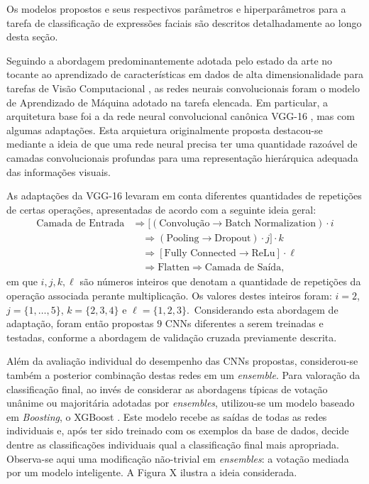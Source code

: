 Os modelos propostos e seus respectivos parâmetros e hiperparâmetros para a tarefa de classificação de expressões faciais são descritos detalhadamente ao longo desta seção.

Seguindo a abordagem predominantemente adotada pelo estado da arte no tocante ao aprendizado de características em dados de alta dimensionalidade para tarefas de Visão Computacional \cite{Khan:Livro}, as redes neurais convolucionais foram o modelo de Aprendizado de Máquina adotado na tarefa elencada. Em particular, a arquitetura base foi a da rede neural convolucional canônica VGG-16 \cite{VGG}, mas com algumas adaptações. Esta arquietura originalmente proposta  destacou-se mediante a ideia de que uma rede neural precisa ter uma quantidade razoável  de camadas convolucionais profundas para uma representação hierárquica adequada das informações visuais.

As adaptações da VGG-16 levaram em conta diferentes quantidades de repetições de certas operações, apresentadas de acordo com a seguinte ideia geral:
\begin{equation}
\begin{split}
\textrm{Camada de Entrada} & \Rightarrow [ (\textrm{Convolução} \rightarrow \textrm{Batch Normalization})\cdot i\\
 &\quad \Rightarrow (\textrm{Pooling} \rightarrow \textrm{Dropout})\cdot j]\cdot k \\
 &\quad \Rightarrow [\textrm{Fully Connected} \rightarrow \textrm{ReLu}]\cdot \ell \\
 &\quad \Rightarrow \textrm{Flatten} \Rightarrow \textrm{Camada de Saída},
\end{split}
\end{equation} em que $i, j, k, \ell$ são números inteiros que denotam a quantidade de repetições da operação associada perante multiplicação. Os valores destes inteiros foram: $i = 2$, $j = \{1, \ldots, 5\}$, $k = \{2, 3, 4\}$ e $\ell = \{ 1,2,3 \}$.\ Considerando esta abordagem de adaptação, foram então propostas $9$ CNNs diferentes a serem treinadas e testadas, conforme a abordagem de validação cruzada previamente descrita.


Além da avaliação individual do desempenho das CNNs propostas, considerou-se também a posterior combinação destas redes em um \emph{ensemble}. Para valoração da classificação final, ao invés de considerar as abordagens típicas de votação unânime ou majoritária adotadas por \emph{ensembles}, utilizou-se um modelo baseado em \emph{Boosting}, o XGBoost \cite{Chen:Boosting}. Este modelo recebe as saídas de todas as redes individuais e, após ter sido treinado com os exemplos da base de dados, decide dentre as classificações individuais qual a classificação final mais apropriada. Observa-se aqui uma modificação não-trivial em \emph{ensembles}: a votação mediada por um modelo inteligente. A Figura X ilustra a ideia considerada.

